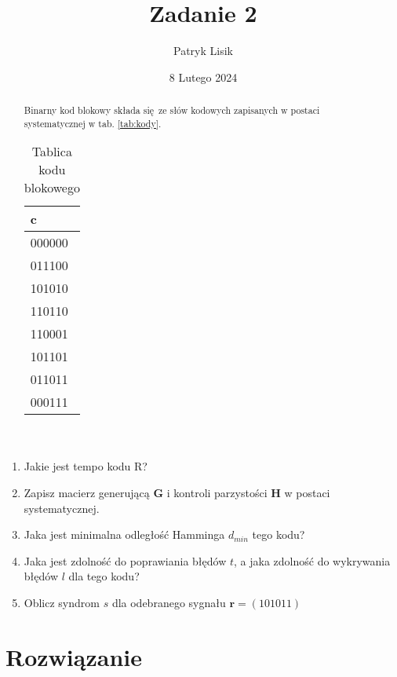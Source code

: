 \documentclass[12pt]{article}
\title{Zadanie 2}
\author{Patryk Lisik}
\date{\(8\) Lutego  2024}
\begin{document}
    \maketitle
    \renewcommand{\abstractname}{Treść}

    \begin{abstract}
        Binarny kod blokowy składa się ze słów kodowych zapisanych w postaci systematycznej w tab. \ref{tab:kody}.
        \begin{table}[h]
            \centering
            \begin{tabular}{l}
                \hline
                c       \\  \hline
                000000  \\ 
                011100  \\
                101010  \\
                110110  \\
                110001  \\
                101101  \\
                011011  \\
                000111  \\ \hline
                
            \end{tabular}
            \caption{Tablica kodu blokowego} 
            \label{tab:kody}
        \end{table}
    \end{abstract}

    \begin{enumerate}[label=(\alph*)]
            \item Jakie jest tempo kodu R? 
            \item Zapisz macierz generującą $\mathbf{G}$ i kontroli parzystości $\mathbf{H}$ w postaci systematycznej.
            \item Jaka jest minimalna odległość Hamminga $d_{min}$ tego kodu?
            \item Jaka jest zdolność do poprawiania błędów $t$, a jaka zdolność do wykrywania błędów $l$ dla tego kodu?
            \item Oblicz syndrom $s$ dla odebranego sygnału $\mathbf{r} = (101011)$
    \end{enumerate}


    \section*{Rozwiązanie}
    
\end{document}
